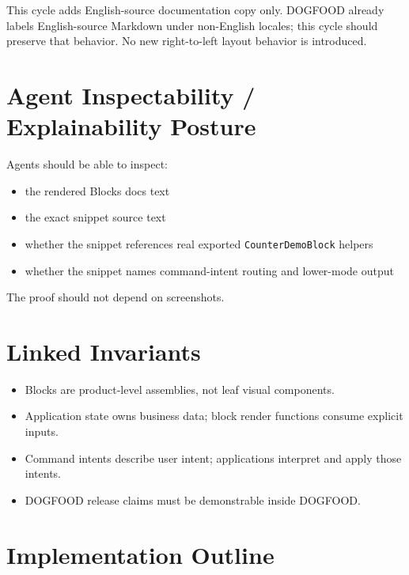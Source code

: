 This cycle adds English-source documentation copy only. DOGFOOD already labels English-source Markdown under non-English locales; this cycle should preserve that behavior. No new right-to-left layout behavior is introduced.

\section{Agent Inspectability / Explainability Posture}\label{record-143-agent-inspectability-explainability-posture}

Agents should be able to inspect:

\begin{itemize}
\tightlist
\item
  the rendered Blocks docs text
\item
  the exact snippet source text
\item
  whether the snippet references real exported \texttt{C\allowbreak{}o\allowbreak{}u\allowbreak{}n\allowbreak{}t\allowbreak{}e\allowbreak{}r\allowbreak{}D\allowbreak{}e\allowbreak{}m\allowbreak{}o\allowbreak{}B\allowbreak{}l\allowbreak{}o\allowbreak{}c\allowbreak{}k} helpers
\item
  whether the snippet names command-intent routing and lower-mode output
\end{itemize}

The proof should not depend on screenshots.

\section{Linked Invariants}\label{record-143-linked-invariants}

\begin{itemize}
\tightlist
\item
  Blocks are product-level assemblies, not leaf visual components.
\item
  Application state owns business data; block render functions consume explicit inputs.
\item
  Command intents describe user intent; applications interpret and apply those intents.
\item
  DOGFOOD release claims must be demonstrable inside DOGFOOD.
\end{itemize}

\section{Implementation Outline}\label{record-143-implementation-outline}

